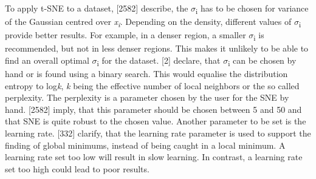 To apply t-SNE to a dataset, \textcite{maaten2008visualizing}[2582] describe, the $\sigma$\textsubscript{i} has to be chosen for variance of the Gaussian centred over \textit{x\textsubscript{i}}. Depending on the density, different values of $\sigma$\textsubscript{i} provide better results. For example, in a denser region, a smaller $\sigma$\textsubscript{i} is recommended, but not in less denser regions. This makes it unlikely to be able to find an overall optimal  $\sigma$\textsubscript{i} for the dataset. \textcite{hinton2003stochastic}[2] declare, that $\sigma$\textsubscript{i} can be chosen by hand or is found using a binary search. This would equalise the distribution entropy to log\textit{k}, \textit{k} being the effective number of local neighbors or the so called perplexity. The perplexity is a parameter chosen by the user for the SNE by hand. \textcite{maaten2008visualizing}[2582] imply, that this parameter should be chosen between 5 and 50 and that SNE is quite robust to the chosen value. 
Another parameter to be set is the learning rate. \textcite{han2011data}[332] clarify, that the learning rate parameter is used to support the finding of global minimums, instead of being caught in a local minimum. A learning rate set too low will result in slow learning. In contrast, a learning rate set too high could lead to poor results.






